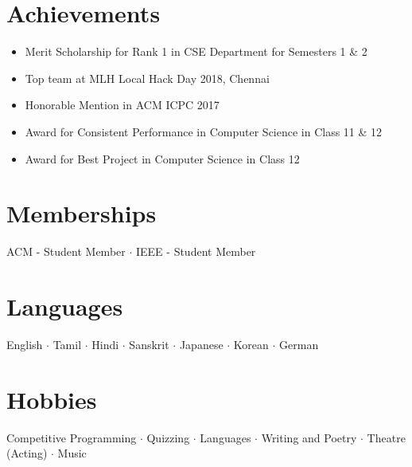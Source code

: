 \documentclass[letterpaper,11pt]{article}
\begin{document}
\section{Achievements}
\begin{itemize}[leftmargin=*]
\item Merit Scholarship for Rank 1 in CSE Department for Semesters 1 \& 2
\item Top team at MLH Local Hack Day 2018, Chennai
\item Honorable Mention in ACM ICPC 2017
\item Award for Consistent Performance in Computer Science in Class 11 \& 12
\item Award for Best Project in Computer Science in Class 12
\end{itemize}


\section{Memberships}
ACM - Student Member $\cdot$ IEEE - Student Member

\section{Languages}
English $\cdot$ Tamil $\cdot$ Hindi $\cdot$ Sanskrit $\cdot$ Japanese $\cdot$ Korean $\cdot$ German


\section{Hobbies}
Competitive Programming $\cdot$ Quizzing $\cdot$ Languages $\cdot$ Writing and Poetry $\cdot$ Theatre (Acting) $\cdot$ Music


\end{document}

